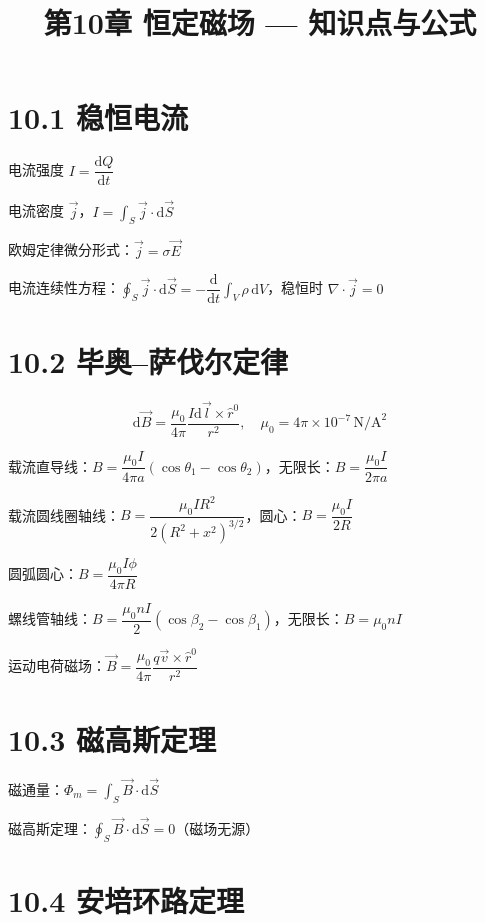 \documentclass{ctexart}
\title{\textbf{第10章 恒定磁场} --- 知识点与公式}
\author{}
\date{}
\begin{document}
\maketitle

\section*{10.1 稳恒电流}

电流强度 $I = \dfrac{\mathrm{d}Q}{\mathrm{d}t}$

电流密度 $\vec{j}$，$I = \displaystyle\int_S \vec{j}\cdot\mathrm{d}\vec{S}$

欧姆定律微分形式：$\vec{j} = \sigma\vec{E}$

电流连续性方程：$\displaystyle\oint_S \vec{j}\cdot\mathrm{d}\vec{S} = -\dfrac{\mathrm{d}}{\mathrm{d}t}\int_V \rho\,\mathrm{d}V$，稳恒时 $\nabla\cdot\vec{j} = 0$

\section*{10.2 毕奥--萨伐尔定律}

\[
\mathrm{d}\vec{B} = \frac{\mu_0}{4\pi}\frac{I\mathrm{d}\vec{l}\times\hat{r}^{0}}{r^{2}},\quad \mu_0 = 4\pi\times10^{-7}\,\text{N/A}^{2}
\]

载流直导线：$B = \dfrac{\mu_0 I}{4\pi a}(\cos\theta_1 - \cos\theta_2)$，无限长：$B = \dfrac{\mu_0 I}{2\pi a}$

载流圆线圈轴线：$B = \dfrac{\mu_0 I R^{2}}{2(R^{2}+x^{2})^{3/2}}$，圆心：$B = \dfrac{\mu_0 I}{2R}$

圆弧圆心：$B = \dfrac{\mu_0 I\phi}{4\pi R}$

螺线管轴线：$B = \dfrac{\mu_0 nI}{2}(\cos\beta_2 - \cos\beta_1)$，无限长：$B = \mu_0 nI$

运动电荷磁场：$\vec{B} = \dfrac{\mu_0}{4\pi}\dfrac{q\vec{v}\times\hat{r}^{0}}{r^{2}}$

\section*{10.3 磁高斯定理}

磁通量：$\Phi_m = \displaystyle\int_S \vec{B}\cdot\mathrm{d}\vec{S}$

磁高斯定理：$\displaystyle\oint_S \vec{B}\cdot\mathrm{d}\vec{S} = 0$（磁场无源）

\section*{10.4 安培环路定理}
\end{document}
